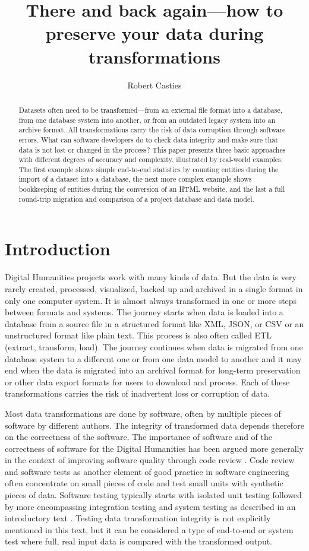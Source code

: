 \documentclass[final]{anthology-ch} %
\title{There and back again---how to preserve your data during transformations}
\author[1]{Robert Casties}[
  orcid=0009-0008-9370-1303
]
\affiliation{1}{Digital Humanities Team, Max Planck Institute for History of Science, Berlin, Germany}
\begin{document}
\maketitle

\begin{abstract}
Datasets often need to be transformed---from an external file format into a database, from one database system into another, or from an outdated legacy system into an archive format. All transformations carry the risk of data corruption through software errors. What can software developers do to check data integrity and make sure that data is not lost or changed in the process? This paper presents three basic approaches with different degrees of accuracy and complexity, illustrated by real-world examples. The first example shows simple end-to-end statistics by counting entities during the import of a dataset into a database, the next more complex example shows bookkeeping of entities during the conversion of an HTML website, and the last a full round-trip migration and comparison of a project database and data model.
\end{abstract}

\section{Introduction}

Digital Humanities projects work with many kinds of data. But the data is very rarely created, processed, visualized, backed up and archived in a single format in only one computer system. It is almost always transformed in one or more steps between formats and systems. The journey starts when data is loaded into a database from a source file in a structured format like XML, JSON, or CSV or an unstructured format like plain text. This process is also often called ETL (extract, transform, load). The journey continues when data is migrated from one database system to a different one or from one data model to another and it may end when the data is migrated into an archival format for long-term preservation or other data export formats for users to download and process. Each of these transformations carries the risk of inadvertent loss or corruption of data.

Most data transformations are done by software, often by multiple pieces of software by different authors. The integrity of transformed data depends therefore on the correctness of the software. The importance of software and of the correctness of software for the Digital Humanities has been argued more generally in  the context of improving software quality through code review \autocite{damerow_code_2025}. Code review and software tests as another element of good practice in software engineering often concentrate on small pieces of code and test small units with synthetic pieces of data. Software testing typically starts with isolated unit testing followed by more encompassing integration testing and system testing as described in an introductory text \autocite{leloudas_introduction_2023}. Testing data transformation integrity is not explicitly mentioned in this text, but it can be considered a type of end-to-end or system test where full, real input data is compared with the transformed output.
\end{document}
